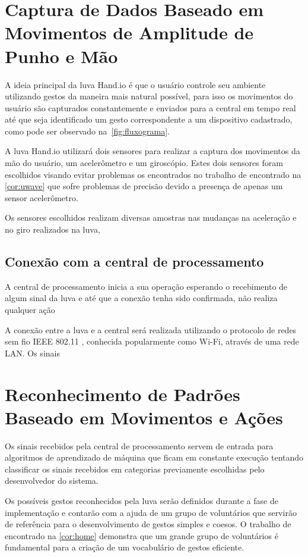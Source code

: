 \section{Captura de Dados Baseado em Movimentos de Amplitude de Punho e Mão}

A ideia principal da luva Hand.io é que o usuário controle seu ambiente utilizando gestos da maneira mais natural possível, para isso os movimentos do usuário são capturados constantemente e enviados para a central em tempo real até que seja identificado um gesto correspondente a um dispositivo cadastrado, como pode ser observado na~\autoref{fig:fluxograma}.

A luva Hand.io utilizará dois sensores para realizar a captura dos movimentos da mão do usuário, um acelerômetro e um giroscópio. Estes dois sensores foram escolhidos visando evitar problemas os encontrados no trabalho de  encontrado na \autoref{cor:uwave} que sofre problemas de precisão devido a presença de apenas um sensor acelerômetro.

Os sensores escolhidos realizam diversas amostras nas mudanças na aceleração e no giro realizados na luva, 



\subsection{Conexão com a central de processamento}

A central de processamento inicia a sua operação esperando o recebimento de algum sinal da luva e até que a conexão tenha sido confirmada, não realiza qualquer ação

A conexão entre a luva e a central será realizada utilizando o protocolo de redes sem fio IEEE 802.11  \cite{802.11:1997}, conhecida popularmente como Wi-Fi, através de uma rede LAN. Os sinais 

\section{Reconhecimento de Padrões Baseado em Movimentos e Ações}

Os sinais recebidos pela central de processamento servem de entrada para algoritmos de aprendizado de máquina que ficam em constante execução tentando classificar os sinais recebidos em categorias previamente escolhidas pelo desenvolvedor do sistema. 

Os possíveis gestos reconhecidos pela luva serão definidos durante a fase de implementação e contarão com a ajuda de um grupo de voluntários que servirão de referência para o desenvolvimento de gestos simples e coesos. O trabalho de  encontrado na \autoref{cor:home} demonstra que um grande grupo de voluntários é fundamental para a criação de um vocabulário de gestos eficiente. 

